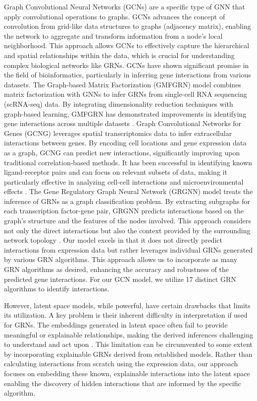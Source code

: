 \documentclass{article}
\begin{document}
Graph Convolutional Neural Networks (GCNs) are a specific type of GNN that apply convolutional operations to graphs. GCNs advances the concept of convolution from grid-like data structures to graphs (adjacency matrix), enabling the network to aggregate and transform information from a node's local neighborhood. This approach allows GCNs to effectively capture the hierarchical and spatial relationships within the data, which is crucial for understanding complex biological networks like GRNs. GCNs have shown significant promise in the field of bioinformatics, particularly in inferring gene interactions from various datasets. The Graph-based Matrix Factorization  (GMFGRN) model combines matrix factorization with GNNs to infer GRNs from single-cell RNA sequencing (scRNA-seq) data. By integrating dimensionality reduction techniques with graph-based learning, GMFGRN has demonstrated improvements in identifying gene interactions across multiple datasets \cite{gmfgrn}. Graph Convolutional Networks for Genes (GCNG) leverages spatial transcriptomics data to infer extracellular interactions between genes. By encoding cell locations and gene expression data as a graph, GCNG can predict new interactions, significantly improving upon traditional correlation-based methods. It has been successful in identifying known ligand-receptor pairs and can focus on relevant subsets of data, making it particularly effective in analyzing cell-cell interactions and microenvironmental effects \cite{yuan2020gcng}. The Gene Regulatory Graph Neural Network (GRGNN) model treats the inference of GRNs as a graph classification problem. By extracting subgraphs for each transcription factor-gene pair, GRGNN predicts interactions based on the graph's structure and the features of the nodes involved. This approach considers not only the direct interactions but also the context provided by the surrounding network topology \cite{wang2020inductive}. Our model excels in that it does not directly predict interactions from expression data but rather leverages individual GRNs generated by various GRN algorithms. This approach allows us to incorporate as many GRN algorithms as desired, enhancing the accuracy and robustness of the predicted gene interactions. For our GCN model, we utilize 17 distinct GRN algorithms to identify interactions.

However, latent space models, while powerful, have certain drawbacks that limits its utilization. A key problem is their inherent difficulty in interpretation if used for GRNs. The embeddings generated in latent space often fail to provide meaningful or explainable relationships, making the derived inferences challenging to understand and act upon \cite{yang2021deep}. This limitation can be circumvented to some extent by incorporating explainable GRNs derived from established models. Rather than calculating interactions from scratch using the expression data, our approach focuses on embedding these known, explainable interactions into the latent space enabling the discovery of hidden interactions that are informed by the specific algorithm.
\end{document}
